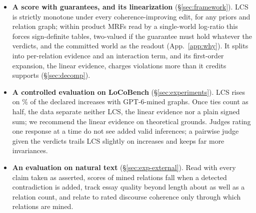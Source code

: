 \begin{itemize}[leftmargin=1.2em,itemsep=1pt,topsep=2pt]
\item \textbf{A score with guarantees, and its linearization} (\S\ref{sec:framework}). LCS is strictly
monotone under every coherence-improving edit, for any priors and relation graph; within product MRFs
read by a single-world log-ratio this forces sign-definite tables, two-valued if the guarantee must
hold whatever the verdicts, and the committed world as the readout (App.~\ref{app:why}). It splits
into per-relation evidence and an interaction term, and its first-order expansion, the linear
evidence, charges violations more than it credits supports (\S\ref{sec:decomp}).
\item \textbf{A controlled evaluation on LoCoBench} (\S\ref{sec:experiments}). LCS rises on
\sThreeGraphGptLamIncPct\% of the declared increases with GPT-6-mined graphs. Once ties count as half, the data separate neither LCS, the linear evidence nor a plain signed sum;
we recommend the linear evidence on theoretical grounds. Judges rating one
response at a time do not see added valid inferences; a pairwise judge given the verdicts trails LCS
slightly on increases and keeps far more invariances.
\item \textbf{An evaluation on natural text} (\S\ref{sec:exp-external}). Read with every claim taken as asserted, scores of mined relations fall when a detected contradiction
is added, track essay quality beyond length about as well as a relation count, and relate to rated
discourse coherence only through which relations are mined.
\end{itemize}
